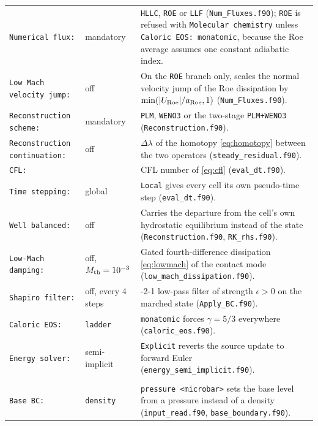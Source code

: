 {\begin{longtable}{@{}>{\raggedright\arraybackslash}p{}>{\raggedright\arraybackslash}p{}>{\raggedright\arraybackslash}p{}@{}}
\midrule
\texttt{Numerical flux:} & mandatory &
  \texttt{HLLC}, \texttt{ROE} or \texttt{LLF}
  (\texttt{Num\_Fluxes.f90}); \texttt{ROE} is refused with
  \texttt{Molecular chemistry} unless \texttt{Caloric EOS: monatomic},
  because the Roe average assumes one constant adiabatic index. \\
\texttt{Low Mach velocity jump:} & off &
  On the \texttt{ROE} branch only, scales the normal velocity jump of the Roe
  dissipation by $\min(|U_{\rm Roe}|/a_{\rm Roe},1)$ \citep{Rieper2011}
  (\texttt{Num\_Fluxes.f90}). \\
\texttt{Reconstruction scheme:} & mandatory &
  \texttt{PLM}, \texttt{WENO3} or the two-stage \texttt{PLM+WENO3}
  (\texttt{Reconstruction.f90}). \\
\texttt{Reconstruction continuation:} & off &
  $\Delta\lambda$ of the homotopy \eqref{eq:homotopy} between the two
  operators (\texttt{steady\_residual.f90}). \\
\texttt{CFL:} & 0.6 &
  CFL number of \eqref{eq:cfl} (\texttt{eval\_dt.f90}). \\
\texttt{Time stepping:} & global &
  \texttt{Local} gives every cell its own pseudo-time step
  (\texttt{eval\_dt.f90}). \\
\texttt{Well balanced:} & off &
  Carries the departure from the cell's own hydrostatic equilibrium instead of
  the state (\texttt{Reconstruction.f90}, \texttt{RK\_rhs.f90}). \\
\texttt{Low-Mach damping:} & off, $M_{\rm th}=10^{-3}$ &
  Gated fourth-difference dissipation \eqref{eq:lowmach} of the contact mode
  (\texttt{low\_mach\_dissipation.f90}). \\
\texttt{Shapiro filter:} & off, every 4 steps &
  1-2-1 low-pass filter of strength $\epsilon>0$ on the marched state
  (\texttt{Apply\_BC.f90}). \\
\texttt{Caloric EOS:} & \texttt{ladder} &
  \texttt{monatomic} forces $\gamma = 5/3$ everywhere
  (\texttt{caloric\_eos.f90}). \\
\texttt{Energy solver:} & semi-implicit &
  \texttt{Explicit} reverts the source update to forward Euler
  (\texttt{energy\_semi\_implicit.f90}). \\
\midrule
\multicolumn{3}{l}{\itshape Boundary and initial conditions}\\
\midrule
\texttt{Base BC:} & \texttt{density} &
  \texttt{pressure <microbar>} sets the base level from a pressure instead of
  a density (\texttt{input\_read.f90}, \texttt{base\_boundary.f90}). \\

\end{longtable}}
